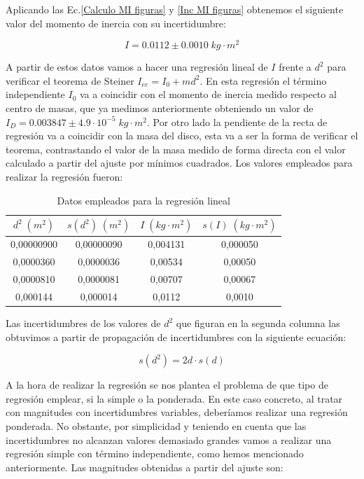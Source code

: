 \documentclass[a4paper,12pt,titlepage]{article}
\begin{document}
Aplicando las Ec.\ref{Calculo MI figuras} y \ref{Inc MI figuras} obtenemos el siguiente valor del momento de inercia con su incertidumbre:

\begin{equation}
    I = 0.0112 \pm 0.0010 \; kg \cdot m^2
\end{equation}

A partir de estos datos vamos a hacer una regresión lineal de $I$ frente a $d^2$ para verificar el teorema de Steiner $I_{ee} = I_0 + md^2$. En esta regresión el término independiente $I_0$ va a coincidir con el momento de inercia medido respecto al centro de masas, que ya medimos anteriormente obteniendo un valor de $I_D = 0.003847 \pm 4.9 \cdot 10^{-5} \; kg\cdot m^2$. Por otro lado la pendiente de la recta de regresión va a coincidir con la masa del disco, esta va a ser la forma de verificar el teorema, contrastando el valor de la masa medido de forma directa con el valor calculado a partir del ajuste por mínimos cuadrados. Los valores empleados para realizar la regresión fueron:


\begin{table}[h!]
    \centering
    \begin{tabular}{|c|c|c|c|}
    \hline
    $d^2 \; (m^2)$  & $s(d^2)\; (m^2)$ & $I\; (kg \cdot m^2)$   & $s(I)\; (kg \cdot m^2)$\\ \hline
    0,00000900   & 0,00000090 & 0,004131 & 0,000050 \\ \hline
    0,0000360  & 0,0000036  & 0,00534  & 0,00050  \\ \hline
    0,0000810  & 0,0000081 & 0,00707  & 0,00067  \\ \hline
    0,000144 & 0,000014   & 0,0112   & 0,0010   \\ \hline
    \end{tabular}
    \caption{Datos empleados para la regresión lineal}
    \label{Datos reg Steiner1}
\end{table}

Las incertidumbres de los valores de $d^2$ que figuran en la segunda columna las obtuvimos a partir de propagación de incertidumbres con la siguiente ecuación:

\begin{equation}
    s(d^2) = 2d\cdot s(d)
\end{equation}

A la hora de realizar la regresión se nos plantea el problema de que tipo de regresión emplear, si la simple o la ponderada. En este caso concreto, al tratar con magnitudes con incertidumbres variables, deberíamos realizar una regresión ponderada. No obstante, por simplicidad y teniendo en cuenta que las incertidumbres no alcanzan valores demasiado grandes vamos a realizar una regresión simple con término independiente, como hemos mencionado anteriormente. Las magnitudes obtenidas a partir del ajuste son:
\end{document}
